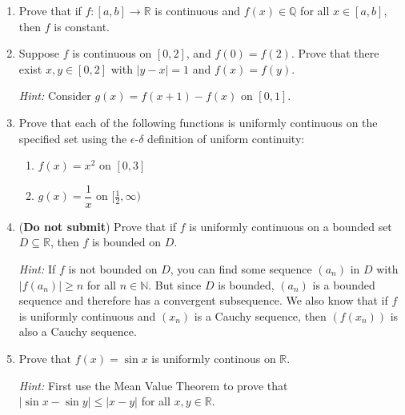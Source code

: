\documentclass[letterpaper,12pt]{article}
\newcommand{\R}{\mathbb{R}}
\newcommand{\N}{\mathbb{N}}
\newcommand{\Q}{\mathbb{Q}}
\newcommand{\abs}[1]{\lvert #1\rvert}
\begin{document}
\begin{enumerate}
\item Prove that if $f:[a,b]\to\R$ is continuous and $f(x)\in \Q$ for all $x\in [a,b]$, then $f$ is constant.


\item Suppose $f$ is continuous on $[0,2]$, and $f(0)=f(2)$. Prove that there exist $x,y\in [0,2]$ with $\abs{y-x}=1$ and $f(x)=f(y)$.

{\em Hint:} Consider $g(x)=f(x+1)-f(x)$ on $[0,1]$.
\item Prove that each of the following functions is uniformly continuous on the specified set using the $\epsilon$-$\delta$ definition of uniform continuity:
\begin{enumerate}
 \item $f(x)=x^2$ on $[0,3]$
 \item $g(x)=\dfrac{1}{x}$ on $[\frac{1}{2},\infty)$
\end{enumerate}
\item ({\bf Do not submit}) Prove that if $f$ is uniformly continuous on a bounded set $D\subseteq \R$, then $f$ is bounded on $D$.

{\em Hint:} If $f$ is not bounded on $D$, you can find some sequence $(a_n)$ in $D$ with $\abs{f(a_n)}\geq n$ for all $n\in\N$. But since $D$ is bounded, $(a_n)$ is a bounded sequence and therefore has a convergent subsequence. We also know that if $f$ is uniformly continuous and $(x_n)$ is a Cauchy sequence, then $(f(x_n))$ is also a Cauchy sequence.

\item Prove that $f(x)=\sin x$ is uniformly continous on $\R$.

{\em Hint:} First use the Mean Value Theorem to prove that $\abs{\sin x-\sin y}\leq \abs{x-y}$ for all $x,y\in\R$.



\end{enumerate}
\end{document}
